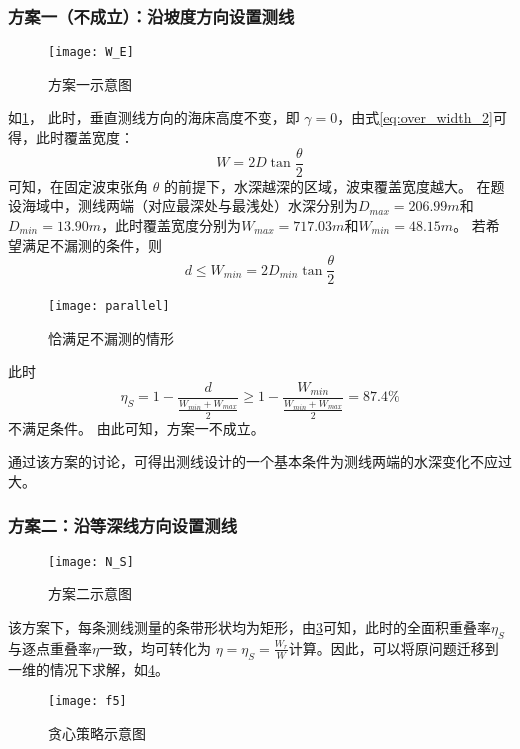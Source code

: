 \documentclass[withoutpreface,bwprint]{cumcmthesis} %
\begin{document}
        \subsubsection{方案一（不成立）：沿坡度方向设置测线}
        \begin{figure}[H]
            \centering
            \texttt{[image: W\_E]}
            \caption{方案一示意图}
            \label{fig:W_E}
        \end{figure}
        如\cref{fig:W_E}，
        此时，垂直测线方向的海床高度不变，即 $\gamma = 0$，由式\cref{eq:over_width_2}可得，此时覆盖宽度：
        \begin{equation}
            W = 2D\tan\frac{\theta}{2}
            \label{eq:over_width_3}
        \end{equation}
        可知，在固定波束张角 $\theta$ 的前提下，水深越深的区域，波束覆盖宽度越大。
        在题设海域中，测线两端（对应最深处与最浅处）水深分别为$D_{max} = 206.99m$和$D_{min} = 13.90m$，此时覆盖宽度分别为$W_{max} = 717.03m$和$W_{min} = 48.15m$。
        若希望满足不漏测的条件，则
        \begin{equation}
            d \leq W_{min} = 2D_{min}\tan\frac{\theta}{2}
            \label{range_d}
        \end{equation}
        \begin{figure}[H]
            \centering
            \texttt{[image: parallel]}
            \caption{恰满足不漏测的情形}
            \label{fig:parallel}
        \end{figure}
        此时
        \begin{equation}
            \eta_S = 1 - \frac{d}{\frac{W_{min} + W_{max}}{2}} \geq 1 - \frac{W_{min}}{\frac{W_{min}+W_{max}}{2}} = 87.4\%
            \label{solve_eta_S}
        \end{equation}
        不满足条件。
        由此可知，方案一不成立。
        
        通过该方案的讨论，可得出测线设计的一个基本条件为测线两端的水深变化不应过大。
    
        \subsubsection{方案二：沿等深线方向设置测线}
        \begin{figure}[H]
            \centering
            \texttt{[image: N\_S]}
            \caption{方案二示意图}
            \label{fig:N_S}
        \end{figure}
        该方案下，每条测线测量的条带形状均为矩形，由\cref{fig:N_S}可知，此时的全面积重叠率$\eta_S$与逐点重叠率$\eta$一致，均可转化为
        $\eta = \eta_S = \frac{W_r}{W}$计算。因此，可以将原问题迁移到一维的情况下求解，如\cref{fig:f5}。
        \begin{figure}[H]
            \centering
            \texttt{[image: f5]}
            \caption{贪心策略示意图}
            \label{fig:f5}
        \end{figure}
        
\end{document}
